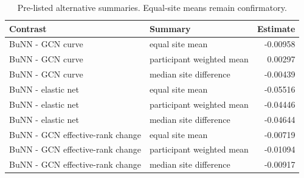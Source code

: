\begin{table}[H]
\centering
\caption{Pre-listed alternative summaries. Equal-site means remain confirmatory.}
\label{tab:supp-robustness-summaries}
\footnotesize
\begin{tabularx}{\textwidth}{Xlr}
\toprule
Contrast & Summary & Estimate \\
\midrule
BuNN - GCN curve & equal site mean & -0.00958 \\
BuNN - GCN curve & participant weighted mean & 0.00297 \\
BuNN - GCN curve & median site difference & -0.00439 \\
BuNN - elastic net & equal site mean & -0.05516 \\
BuNN - elastic net & participant weighted mean & -0.04446 \\
BuNN - elastic net & median site difference & -0.04644 \\
BuNN - GCN effective-rank change & equal site mean & -0.00719 \\
BuNN - GCN effective-rank change & participant weighted mean & -0.01094 \\
BuNN - GCN effective-rank change & median site difference & -0.00917 \\
\bottomrule
\end{tabularx}
\end{table}
